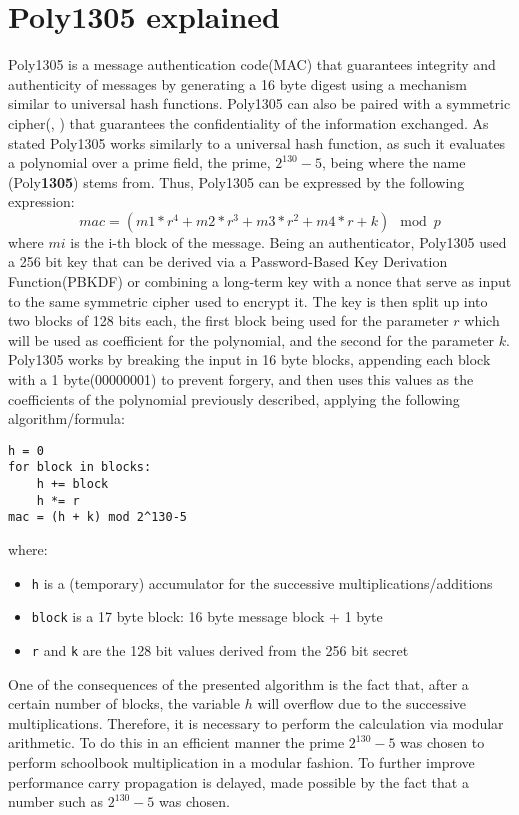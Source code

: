\documentclass[twocolumn]{article}
\begin{document}
\section{Poly1305 explained}
\label{poly135_101}
Poly1305 is a message authentication code(MAC) that guarantees integrity and authenticity of messages by generating a 16 byte digest using a mechanism similar
to universal hash functions. Poly1305 can also be paired with a symmetric cipher(\cite{poly1305_aes_bernstein}, \cite{poly1305_chacha20_iot}) 
that guarantees the confidentiality of the information exchanged. 
As stated Poly1305 works similarly to a universal hash function, as such it evaluates a polynomial over a prime field, the prime, $2^{130}-5$, being where the 
name (Poly\textbf{1305}) stems from. Thus, Poly1305 can be expressed by the following expression: 
$$mac = (m1 * r^4 + m2 * r^3 + m3 * r^2 + m4 * r + k) \mod{p} $$ 
where $mi$ is the i-th block of the message. Being an authenticator,  Poly1305 used a 256 bit key that can be derived via a Password-Based Key Derivation Function(PBKDF)
or combining a long-term key with a nonce that serve as input to the same symmetric cipher used to encrypt it. The key is then split up into two blocks of 128 
bits each, the first block being used for the parameter $r$ which will be used as coefficient for the polynomial, and the second for the parameter $k$. 
Poly1305 works by breaking the input in 16 byte blocks, appending each block with a 1 byte(00000001) to prevent forgery, and then uses this values as the 
coefficients of the polynomial previously described, applying the following algorithm/formula:

\begin{Verbatim}[fontsize=\footnotesize]
h = 0
for block in blocks:
    h += block
    h *= r
mac = (h + k) mod 2^130-5
\end{Verbatim}

where:
\begin{itemize}
    \item \texttt{h} is a (temporary) accumulator for the successive multiplications/additions
    \item \texttt{block} is a 17 byte block: 16 byte message block + 1 byte
    \item \texttt{r} and \texttt{k} are the 128 bit values derived from the 256 bit secret
\end{itemize}

One of the consequences of the presented algorithm is the fact that, after a certain number of blocks, the variable $h$ will overflow due to the successive multiplications.
Therefore, it is necessary to perform the calculation via modular arithmetic. To do this in an efficient manner the prime $2^{130}-5$ was chosen to perform schoolbook 
multiplication in a modular fashion. To further improve performance carry propagation is delayed, made possible by the fact that a number such as $2^{130}-5$ was chosen.
\end{document}
